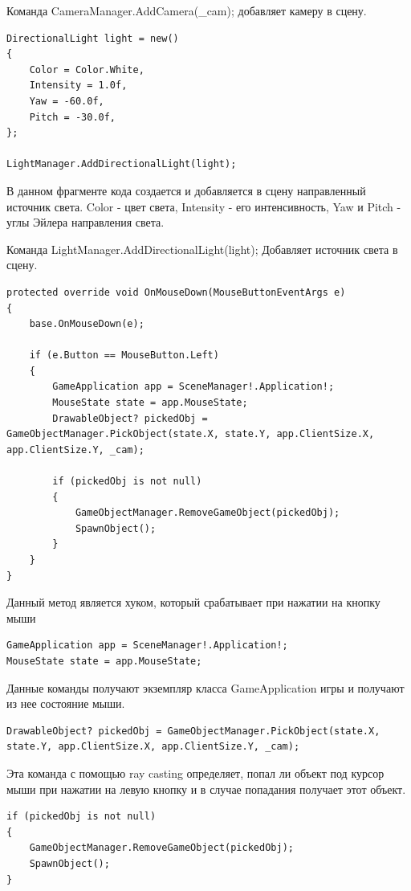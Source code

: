Команда CameraManager.AddCamera(\_cam); добавляет камеру в сцену.

\begin{lstlisting}
DirectionalLight light = new()
{
	Color = Color.White,
	Intensity = 1.0f,
	Yaw = -60.0f,
	Pitch = -30.0f,
};

LightManager.AddDirectionalLight(light);
\end{lstlisting}

В данном фрагменте кода создается и добавляется в сцену направленный источник света. Color - цвет света, Intensity - его интенсивность, Yaw и Pitch - углы Эйлера направления света.

Команда LightManager.AddDirectionalLight(light); Добавляет источник света в сцену.

\begin{lstlisting}
protected override void OnMouseDown(MouseButtonEventArgs e)
{
	base.OnMouseDown(e);
	
	if (e.Button == MouseButton.Left)
	{
		GameApplication app = SceneManager!.Application!;
		MouseState state = app.MouseState;
		DrawableObject? pickedObj = GameObjectManager.PickObject(state.X, state.Y, app.ClientSize.X, app.ClientSize.Y, _cam);
		
		if (pickedObj is not null)
		{
			GameObjectManager.RemoveGameObject(pickedObj);
			SpawnObject();
		}
	}
}
\end{lstlisting}

Данный метод является хуком, который срабатывает при нажатии на кнопку мыши

\begin{lstlisting}
GameApplication app = SceneManager!.Application!;
MouseState state = app.MouseState;
\end{lstlisting}

Данные команды получают экземпляр класса GameApplication игры и получают из нее состояние мыши.

\begin{lstlisting}
DrawableObject? pickedObj = GameObjectManager.PickObject(state.X, state.Y, app.ClientSize.X, app.ClientSize.Y, _cam);
\end{lstlisting}

Эта команда с помощью ray casting определяет, попал ли объект под курсор мыши при нажатии на левую кнопку и в случае попадания получает этот объект.

\begin{lstlisting}
if (pickedObj is not null)
{
	GameObjectManager.RemoveGameObject(pickedObj);
	SpawnObject();
}
\end{lstlisting}

